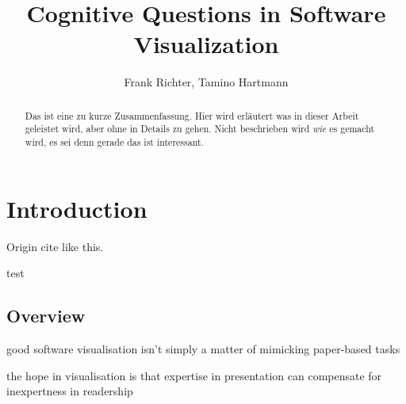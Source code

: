 \documentclass[11pt, a4paper, ngerman, twoside]{article}
\date{}
\theoremstyle{plain}\newtheorem{Lemma}{Lemma}
\theoremstyle{plain}\newtheorem{Satz}[Lemma]{Satz}
\theoremstyle{definition}\newtheorem{Definition}[Lemma]{Definition}
\theoremstyle{definition}\newtheorem*{Beispiel}{Beispiel}
\theoremstyle{remark}\newtheorem*{Bemerkung}{Bemerkung}
\begin{document}
\title{Cognitive Questions in Software Visualization}
\author{Frank Richter, Tamino Hartmann}

\makeatletter
\let\mytitle\@title
\let\myauthor\@author
\makeatother
\maketitle
\begin{abstract}

Das ist eine zu kurze Zusammenfassung.
Hier wird erläutert was in dieser Arbeit geleistet wird, aber ohne in Details zu gehen.
Nicht beschrieben wird \textit{wie} es gemacht wird, es sei denn gerade das ist interessant.

\end{abstract}

\section{Introduction}

Origin cite like this\cite{origin}.

test

\subsection{Overview}

good software visualisation isn’t simply a matter of mimicking paper-based tasks

the hope in visualisation is that expertise in presentation can compensate for inexpertness in readership
\end{document}
